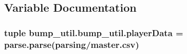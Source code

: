 \subsection{Variable Documentation}
\hypertarget{namespacebump__util_1_1bump__util_a476803a0585b05a795f63b956ca0a0cf}{}
\subsubsection[{player\+Data}]{\setlength{\rightskip}{0pt plus 5cm}tuple bump\+\_\+util.\+bump\+\_\+util.\+player\+Data = parse.\+parse(\textquotesingle{}parsing/master.\+csv\textquotesingle{})}\label{namespacebump__util_1_1bump__util_a476803a0585b05a795f63b956ca0a0cf}
